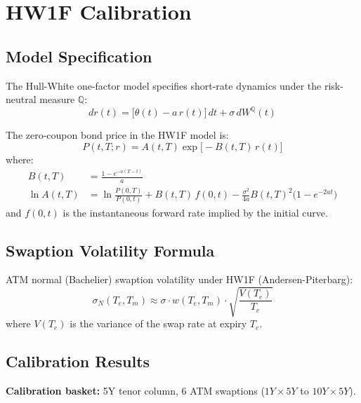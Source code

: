 \documentclass[11pt,a4paper]{article}
\begin{document}
\section{HW1F Calibration}

\subsection{Model Specification}

The Hull-White one-factor model specifies short-rate dynamics under the
risk-neutral measure $\mathbb{Q}$:
\begin{equation}
  dr(t) = \bigl[\theta(t) - a \, r(t)\bigr] \, dt + \sigma \, dW^\mathbb{Q}(t)
\end{equation}

\noindent The zero-coupon bond price in the HW1F model is:
\begin{equation}
  P(t, T; r) = A(t,T) \exp\bigl[-B(t,T) \, r(t)\bigr]
\end{equation}
where:
\begin{align}
  B(t,T) &= \frac{1 - e^{-a(T-t)}}{a} \\
  \ln A(t,T) &= \ln \frac{P(0,T)}{P(0,t)} + B(t,T) \, f(0,t)
               - \frac{\sigma^2}{4a} B(t,T)^2 \bigl(1 - e^{-2at}\bigr)
\end{align}
and $f(0,t)$ is the instantaneous forward rate implied by the initial curve.

\subsection{Swaption Volatility Formula}

ATM normal (Bachelier) swaption volatility under HW1F (Andersen-Piterbarg):
\begin{equation}
  \sigma_N(T_e, T_m) \approx \sigma \cdot w(T_e, T_m) \cdot
  \sqrt{\frac{V(T_e)}{T_e}}
\end{equation}
where $V(T_e)$ is the variance of the swap rate at expiry $T_e$.

\subsection{Calibration Results}

\textbf{Calibration basket:} 5Y tenor column, 6 ATM swaptions ($1Y{\times}5Y$
to $10Y{\times}5Y$).
\end{document}
